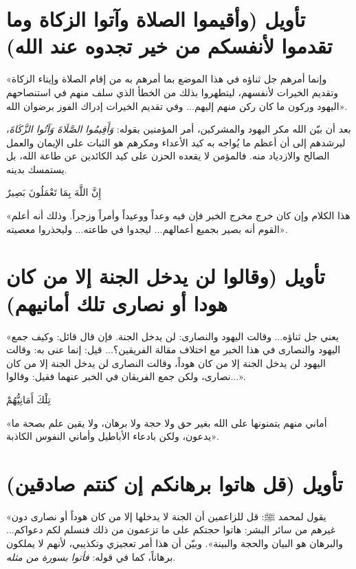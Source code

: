 \separator

\section{تأويل (وأقيموا الصلاة وآتوا الزكاة وما تقدموا لأنفسكم من خير تجدوه عند الله)}
 «وإنما أمرهم جل ثناؤه في هذا الموضع بما أمرهم به من إقام الصلاة وإيتاء الزكاة وتقديم الخيرات لأنفسهم، ليتطهروا بذلك من الخطأ الذي سلف منهم في استنصاحهم اليهود وركون ما كان ركن منهم إليهم... وفي تقديم الخيرات إدراك الفوز برضوان الله».

\begin{fawaid}
بعد أن بيّن الله مكر اليهود والمشركين، أمر المؤمنين بقوله: \textit{وَأَقِيمُوا الصَّلَاةَ وَآتُوا الزَّكَاةَ}، ليرشدهم إلى أن أعظم ما يُواجه به كيد الأعداء ومكرهم هو الثبات على الإيمان والعمل الصالح والازدياد منه. فالمؤمن لا يقعده الحزن على كيد الكائدين عن طاعة الله، بل يستمسك بدينه.
\end{fawaid}

 \begin{ayah}إِنَّ اللَّهَ بِمَا تَعْمَلُونَ بَصِيرٌ\end{ayah}  «هذا الكلام وإن كان خرج مخرج الخبر فإن فيه وعداً ووعيداً وأمراً وزجراً. وذلك أنه أعلم القوم أنه بصير بجميع أعمالهم... ليجدوا في طاعته... وليحذروا معصيته».

\separator

\section{تأويل (وقالوا لن يدخل الجنة إلا من كان هودا أو نصارى تلك أمانيهم)}
 «يعني جل ثناؤه... وقالت اليهود والنصارى: لن يدخل الجنة. فإن قال قائل: وكيف جمع اليهود والنصارى في هذا الخبر مع اختلاف مقالة الفريقين؟... قيل: إنما عنى به: وقالت اليهود لن يدخل الجنة إلا من كان هوداً، وقالت النصارى لن يدخل الجنة إلا من كان نصارى، ولكن جمع الفريقان في الخبر عنهما فقيل: وقالوا...».

 \begin{ayah}تِلْكَ أَمَانِيُّهُمْ\end{ayah}  «أماني منهم يتمنونها على الله بغير حق ولا حجة ولا برهان، ولا يقين علم بصحة ما يدعون، ولكن بادعاء الأباطيل وأماني النفوس الكاذبة».

\separator

\section{تأويل (قل هاتوا برهانكم إن كنتم صادقين)}
 «يقول لمحمد ﷺ: قل للزاعمين أن الجنة لا يدخلها إلا من كان هوداً أو نصارى دون غيرهم من سائر البشر: هاتوا حجتكم على ما تزعمون من ذلك فنسلم لكم دعواكم... والبرهان هو البيان والحجة والبينة».
وبيّن  أن هذا أمر تعجيزي وتكذيبي، لأنهم لا يملكون برهاناً، كما في قوله: \textit{فأتوا بسورة من مثله}.

